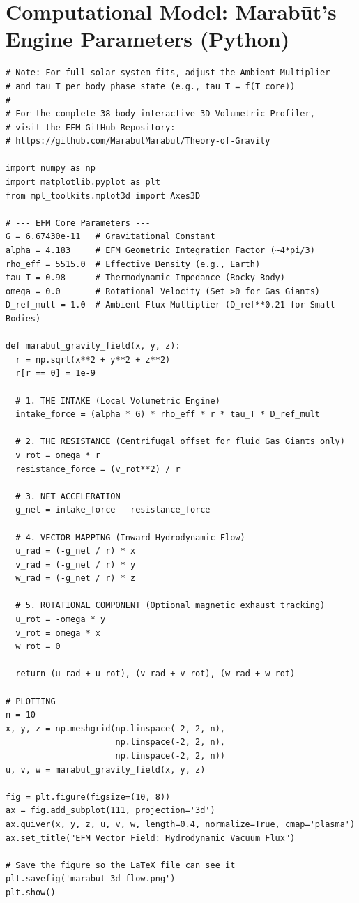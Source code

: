 \documentclass[11pt, a4paper]{article}
\begin{document}
\section{Computational Model: Marab\={u}t's Engine Parameters (Python)}
\begin{verbatim}
# Note: For full solar-system fits, adjust the Ambient Multiplier 
# and tau_T per body phase state (e.g., tau_T = f(T_core))
#
# For the complete 38-body interactive 3D Volumetric Profiler, 
# visit the EFM GitHub Repository: 
# https://github.com/MarabutMarabut/Theory-of-Gravity

import numpy as np
import matplotlib.pyplot as plt
from mpl_toolkits.mplot3d import Axes3D

# --- EFM Core Parameters ---
G = 6.67430e-11   # Gravitational Constant
alpha = 4.183     # EFM Geometric Integration Factor (~4*pi/3)
rho_eff = 5515.0  # Effective Density (e.g., Earth)
tau_T = 0.98      # Thermodynamic Impedance (Rocky Body)
omega = 0.0       # Rotational Velocity (Set >0 for Gas Giants)
D_ref_mult = 1.0  # Ambient Flux Multiplier (D_ref**0.21 for Small Bodies)

def marabut_gravity_field(x, y, z):
  r = np.sqrt(x**2 + y**2 + z**2)
  r[r == 0] = 1e-9 

  # 1. THE INTAKE (Local Volumetric Engine)
  intake_force = (alpha * G) * rho_eff * r * tau_T * D_ref_mult

  # 2. THE RESISTANCE (Centrifugal offset for fluid Gas Giants only)
  v_rot = omega * r
  resistance_force = (v_rot**2) / r

  # 3. NET ACCELERATION
  g_net = intake_force - resistance_force

  # 4. VECTOR MAPPING (Inward Hydrodynamic Flow)
  u_rad = (-g_net / r) * x
  v_rad = (-g_net / r) * y
  w_rad = (-g_net / r) * z
  
  # 5. ROTATIONAL COMPONENT (Optional magnetic exhaust tracking)
  u_rot = -omega * y
  v_rot = omega * x
  w_rot = 0

  return (u_rad + u_rot), (v_rad + v_rot), (w_rad + w_rot)

# PLOTTING
n = 10
x, y, z = np.meshgrid(np.linspace(-2, 2, n), 
                      np.linspace(-2, 2, n), 
                      np.linspace(-2, 2, n))
u, v, w = marabut_gravity_field(x, y, z)

fig = plt.figure(figsize=(10, 8))
ax = fig.add_subplot(111, projection='3d')
ax.quiver(x, y, z, u, v, w, length=0.4, normalize=True, cmap='plasma')
ax.set_title("EFM Vector Field: Hydrodynamic Vacuum Flux")

# Save the figure so the LaTeX file can see it
plt.savefig('marabut_3d_flow.png') 
plt.show()
\end{verbatim}
\end{document}
